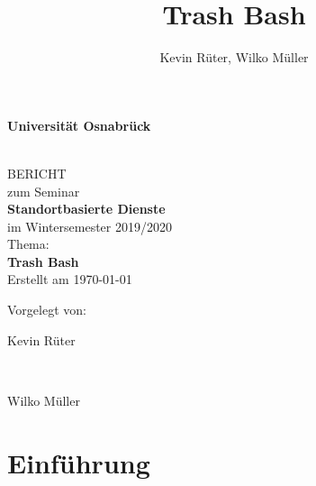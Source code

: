 \documentclass[a4paper, 11pt, DIV=11, listof=numbered, numbers=noenddot]{scrartcl}
\title{Trash Bash}
\author{Kevin Rüter, Wilko Müller}
\begin{document}
	
	
	\begin{titlepage}
		\begin{center}
			\vspace*{1.5cm}
			\begin{Large}
				\textbf{Universit\"at Osnabr\"uck}
			\end{Large}
			
			\noindent\hrulefill
			\\[3.5cm]
			BERICHT \\[1cm]
			zum Seminar \\[1cm]
			\textbf{Standortbasierte Dienste} \\[1.5cm]    %
			im Wintersemester 2019/2020 \\[1.5cm]   %
			Thema: \\[0.5cm]
			\textbf{Trash Bash} \\[2cm]        %
			Erstellt am \today
		\end{center}
		\vfill
		\begin{flushleft}
			Vorgelegt von: 
			\hfill \parbox{60mm}{Kevin Rüter} \\  %
			\hfill \parbox{60mm}{Wilko Müller}
		\end{flushleft}
	\end{titlepage}
	
	
	\newpage
	\tableofcontents 
	
	
	
	\newpage
	
	\maketitle
	
	\begin{abstract}
		\blindtext
	\end{abstract}
	
	\section{Einführung}
	\blindtext
\end{document}

